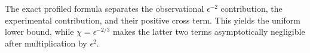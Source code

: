 The exact profiled formula separates the observational \(\epsilon^{-2}\) contribution, the experimental contribution, and their positive cross term. This yields the uniform lower bound, while \(\chi=\epsilon^{-2/3}\) makes the latter two terms asymptotically negligible after multiplication by \(\epsilon^2\).